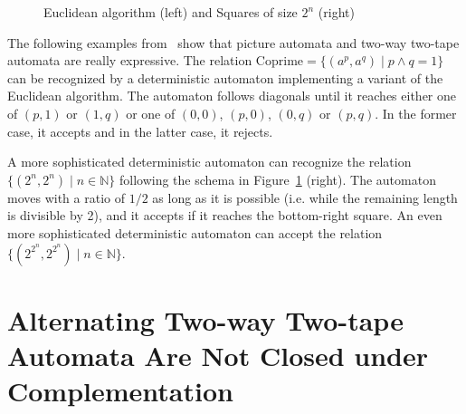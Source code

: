 \documentclass[runningheads, envcountsame, a4paper]{llncs}
\newcommand*{\N}{\mathbb{N}}
\newcommand*{\ie}{i.e.\xspace}
\renewcommand*{\models}{two-way two-tape automata\xspace}
\newcommand*{\MODELS}{Two-way Two-tape Automata\xspace}
\newcommand*{\Coprime}{\mathrm{Coprime}}
\begin{document}
\begin{figure}[ht]
  \centering
  \quad
  \caption{Euclidean algorithm (left) and Squares of size $2^n$ (right)}
  \label{coprime}
  \label{expsquare}
\end{figure}

The following examples from~\cite{KariMoore04} show that picture automata
and \models are really expressive.  The relation $\Coprime = \{(a^p, a^q)
\mid p \wedge q = 1\}$ can be recognized by a deterministic automaton
implementing a variant of the Euclidean algorithm.  The automaton follows
diagonals until it reaches either one of $(p,1)$ or $(1,q)$ or one of
$(0,0)$, $(p,0)$, $(0,q)$ or $(p,q)$.  In the former case, it accepts and
in the latter case, it rejects.

A more sophisticated deterministic automaton can recognize the relation
$\{(2^n, 2^n) \mid n \in \N\}$ following the schema in
Figure~\ref{expsquare} (right).  The automaton moves with a ratio of $1/2$
as long as it is possible (\ie while the remaining length is divisible by
2), and it accepts if it reaches the bottom-right square.  An even more
sophisticated deterministic automaton can accept the relation $\{(2^{2^n},
2^{2^n}) \mid n \in \N\}$.


\section{Alternating \MODELS Are Not Closed under Complementation}
\label{proofAFAcompl}
\end{document}
